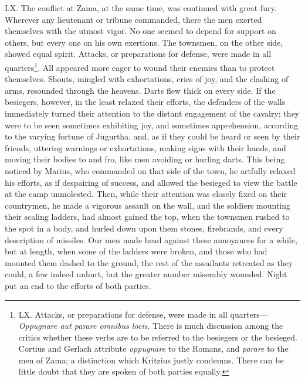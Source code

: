 LX. The conflict at Zama, at the same time, was continued with great
fury. Wherever any lieutenant or tribune commanded, there the men
exerted themselves with the utmost vigor. No one seemed to depend for
support on others, but every one on his own exertions. The townsmen,
on the other side, showed equal spirit. Attacks, or preparations for
defense, were made in all quarters\footnote{LX. Attacks, or preparations for defense, were made in all
quarters—\emph{Oppugnare aut parare omnibus locis.} There is much
discussion among the critics whether these verbs are to be referred to
the besiegers or the besieged. Cortius and Gerlach attribute
\emph{oppugnare} to the Romans, and \emph{parare} to the men of Zama; a
distinction which Kritzius justly condemns. There can be little doubt
that they are spoken of both parties equally.}. All appeared more eager to
wound their enemies than to protect themselves. Shouts, mingled with
exhortations, cries of joy, and the clashing of arms, resounded
through the heavens. Darts flew thick on every side. If the besiegers,
however, in the least relaxed their efforts, the defenders of the
walls immediately turned their attention to the distant engagement of
the cavalry; they were to be seen sometimes exhibiting joy, and
sometimes apprehension, according to the varying fortune of Jugurtha,
and, as if they could be heard or seen by their friends, uttering
warnings or exhortations, making signs with their hands, and moving
their bodies to and fro, like men avoiding or hurling darts. This
being noticed by Marius, who commanded on that side of the town, he
artfully relaxed his efforts, as if despairing of success, and allowed
the besieged to view the battle at the camp unmolested. Then, while
their attention was closely fixed on their countrymen, he made a
vigorous assault on the wall, and the soldiers mounting their scaling
ladders, had almost gained the top, when the townsmen rushed to the
spot in a body, and hurled down upon them stones, firebrands, and
every description of missiles. Our men made head against these
annoyances for a while, but at length, when some of the ladders were
broken, and those who had mounted them dashed to the ground, the rest
of the assailants retreated as they could, a few indeed unhurt, but
the greater number miserably wounded. Night put an end to the efforts
of both parties.

